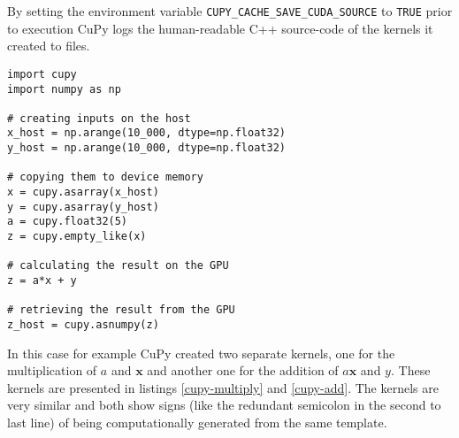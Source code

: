 \documentclass[english,11pt,a4paper,table]{article} %
\begin{document}
By setting the environment variable \texttt{CUPY\_CACHE\_SAVE\_CUDA\_SOURCE} to \texttt{TRUE} prior to execution CuPy logs the human-readable C++ source-code of the kernels it created to files.
\begin{verbatim}
import cupy
import numpy as np

# creating inputs on the host
x_host = np.arange(10_000, dtype=np.float32)
y_host = np.arange(10_000, dtype=np.float32)

# copying them to device memory
x = cupy.asarray(x_host)
y = cupy.asarray(y_host)
a = cupy.float32(5)
z = cupy.empty_like(x)

# calculating the result on the GPU
z = a*x + y

# retrieving the result from the GPU
z_host = cupy.asnumpy(z)
\end{verbatim}

In this case for example CuPy created two separate kernels, one for the multiplication of $a$ and $\mathbf{x}$ and another one for the addition of $a \mathbf{x}$ and $y$.
These kernels are presented in listings \ref{cupy-multiply} and \ref{cupy-add}.
The kernels are very similar and both show signs (like the redundant semicolon in the second to last line) of being computationally generated from the same template.
\end{document}
